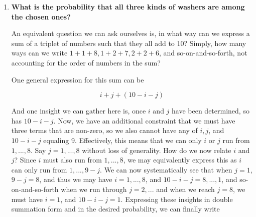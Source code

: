 \documentclass[10pt, oneside]{article}
\begin{document}
\begin{enumerate}[label=8.\arabic*]
\begin{enumerate}
	Here, we must consider all of the instances where we have only the $1/4$ and $1/8$, $1/4$ and $3/8$, and $1/8$ and $3/8$ washers. Moreover, for each pair, we consider each of the $(10, 10-i)$ amount of each in the pair for $i = 0,..., 10$. Since each of these are mutually exclusive events, the probability of only two kinds of washers appearing among the ten is given by
	
	\begin{align*}
	P(\text{only two kinds of washers}) &= \sum^9_{i=1} \frac{10!}{(10-i)! i!} P(X_1)^{10-i} P(X_2)^i + \sum^9_{i=1} \frac{10!}{(10-i)! i!} P(X_1)^{10-i} P(X_3)^i \\
	&\quad +  \sum^9_{i=1} \frac{10!}{(10-i)! i!} P(X_2)^{10-i} P(X_3)^i \approx \boxed{0.135}
	\end{align*}
	
	\item  \begin{tcolorbox}[
	  colback=Cerulean!5!white,
	  colframe=Cerulean!75!black]
	\textbf{What is the probability that all three kinds of washers are among the chosen ones?}
	\end{tcolorbox}
	
	An equivalent question we can ask ourselves is, in what way can we express a sum of a triplet of numbers such that they all add to 10? Simply, how many ways can we write $1+1+8, 1+2+7, 2+2+6$, and so-on-and-so-forth, not accounting for the order of numbers in the sum?
	
	One general expression for this sum can be
	
	\[ i + j + (10 - i - j) \] 
	
	And one insight we can gather here is, once $i$ and $j$ have been determined, so has $10 - i - j$. Now, we have an additional constraint that we must have three terms that are non-zero, so we also cannot have any of $i, j$, and $10 - i - j$ equaling 9. Effectively, this means that we can only $i$ or $j$ run from $1, ..., 8$. Say $j = 1,...,8$ without loss of generality. How do we now relate $i$ and $j$? Since $i$ must also run from $1, ..., 8$, we may equivalently express this as $i$ can only run from $1,..., 9-j$. We can now systematically see that when $j = 1$, $9-j = 8$, and thus we may have $i = 1,..., 8$, and $10-i-j = 8, ..., 1$, and so-on-and-so-forth when we run through $j = 2, ...$ and when we reach $j = 8$, we must have $i = 1$, and $10 - i - j = 1$. Expressing these insights in double summation form and in the desired probability, we can finally write
	

\end{enumerate}
\end{enumerate}
\end{document}
